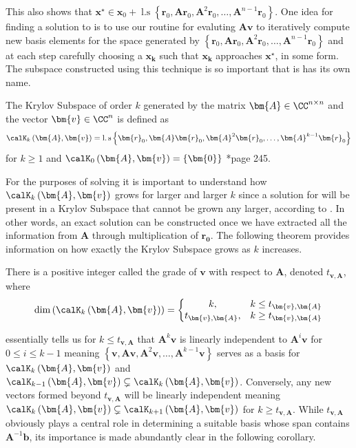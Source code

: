 This also shows that $\bm{x^{\star}} \in \bm{x}_0 + \operatorname{l.s} \left\{ \bm{r}_0, \bm{A} \bm{r}_0, \bm{A}^2 \bm{r}_0, \ldots , \bm{A}^{n-1} \bm{r}_0 \right\}$. One idea for finding a solution to  is to use our routine for evaluting $\bm{A} \bm{v}$ to iteratively compute new basis elements for the space generated by $\left\{ \bm{r}_0, \bm{A} \bm{r}_0, \bm{A}^2 \bm{r}_0, \ldots , \bm{A}^{n-1} \bm{r}_0 \right\}$ and at each step carefully choosing a $\bm{x_k}$ such that $\bm{x_k}$ approaches $\bm{x^{\star}}$, in some form. The subspace constructed using this technique is so important that is has its own name.
\begin{defe} \label{defe: krylov_subspace}
    The Krylov Subspace of order $k$ generated by the matrix $\bm{A} \in \CC^{n \times n}$ and the vector $\bm{v} \in \CC^{n}$ is defined as
    \[
        \calK_{k} \left( \bm{A},\bm{v} \right) = \operatorname{l.s} \left\{ \bm{r}_0, \bm{A} \bm{r}_0, \bm{A}^2 \bm{r}_0, \ldots , \bm{A}^{k-1} \bm{r}_0 \right\}
    \]
    for $k \geq 1$ and $\calK_{0} \left( \bm{A},\bm{v} \right) = \left\{ \bm{0} \right\}$ \cite{TrefethenLloydN.LloydNicholas1997Nla/}*{page 245}.
\end{defe}
For the purposes of solving  it is important to understand how $\calK_{k} \left( \bm{A},\bm{v} \right)$ grows for larger and larger $k$ since a solution for  will be present in a Krylov Subspace that cannot be grown any larger, according to . In other words, an exact solution can be constructed once we have extracted all the information from $\bm{A}$ through multiplication of $\bm{r_0}$. The following theorem provides information on how exactly the Krylov Subspace grows as $k$ increases.
\begin{thm} \label{theorem: grade_of_v}
    There is a positive integer called the grade of $\bm{v}$ with respect to $\bm{A}$, denoted $t_{\bm{v}, \bm{A}}$, where
    \[
        \operatorname{dim} \left( \calK_{k} \left( \bm{A} , \bm{v} \right) \right) = \left\{
        \begin{matrix}
            k,                  & k \leq t_{\bm{v}, \bm{A}} \\
            t_{\bm{v}, \bm{A}}, & k \geq t_{\bm{v}, \bm{A}}
        \end{matrix}
        \right.
    \]
\end{thm}
 essentially tells us for $k \leq t_{\bm{v}, \bm{A}}$ that $\bm{A}^k \bm{v}$ is linearly independent to $\bm{A}^i \bm{v}$ for $0 \leq i \leq k-1$ meaning $\left\{ \bm{v}, \bm{A} \bm{v}, \bm{A}^2 \bm{v}, \ldots , \bm{A}^{k-1} \bm{v} \right\}$ serves as a basis for $\calK_{k} \left( \bm{A},\bm{v} \right)$ and $\calK_{k-1} \left( \bm{A},\bm{v} \right) \subsetneq \calK_{k} \left( \bm{A},\bm{v} \right)$. Conversely, any new vectors formed beyond $t_{\bm{v}, \bm{A}}$ will be linearly independent meaning $\calK_{k} \left( \bm{A},\bm{v} \right) \subsetneq \calK_{k+1} \left( \bm{A},\bm{v} \right)$ for $k \geq t_{\bm{v}, \bm{A}}$. While $t_{\bm{v}, \bm{A}}$ obviously plays a central role in determining a suitable basis whose span contains $\bm{A}^{-1} \bm{b}$, its importance is made abundantly clear in the following corollary.
